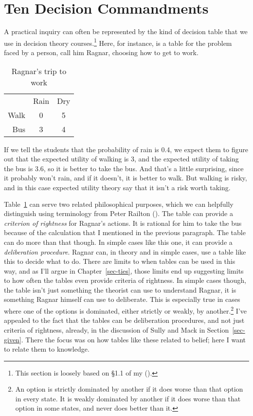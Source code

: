 \documentclass[
  12pt,
  letterpaper,
]{scrbook}
\begin{document}
\section{Ten Decision Commandments}\label{sec-makdec}

A practical inquiry can often be represented by the kind of decision
table that we use in decision theory courses.\footnote{This section is
  loosely based on §1.1 of my ().}
Here, for instance, is a table for the problem faced by a person, call
him Ragnar, choosing how to get to work.

\begin{longtable}[]{@{}rcc@{}}
\caption{Ragnar's trip to work}\label{tbl-walkbus}\tabularnewline
\toprule\noalign{}
\endfirsthead
\endhead
\bottomrule\noalign{}
\endlastfoot
~ & Rain & Dry \\
Walk & 0 & 5 \\
Bus & 3 & 4 \\
\end{longtable}

If we tell the students that the probability of rain is 0.4, we expect
them to figure out that the expected utility of walking is 3, and the
expected utility of taking the bus is 3.6, so it is better to take the
bus. And that's a little surprising, since it probably won't rain, and
if it doesn't, it is better to walk. But walking is risky, and in this
case expected utility theory say that it isn't a risk worth taking.

Table~\ref{tbl-walkbus} can serve two related philosophical purposes,
which we can helpfully distinguish using terminology from Peter Railton
(). The table can provide a
\emph{criterion of rightness} for Ragnar's actions. It is rational for
him to take the bus because of the calculation that I mentioned in the
previous paragraph. The table can do more than that though. In simple
cases like this one, it can provide a \emph{deliberation procedure}.
Ragnar can, in theory and in simple cases, use a table like this to
decide what to do. There are limits to when tables can be used in this
way, and as I'll argue in Chapter~\ref{sec-ties}, those limits end up
suggesting limits to how often the tables even provide criteria of
rightness. In simple cases though, the table isn't just something the
theorist can use to understand Ragnar, it is something Ragnar himself
can use to deliberate. This is especially true in cases where one of the
options is dominated, either strictly or weakly, by another.\footnote{An
  option is strictly dominated by another if it does worse than that
  option in every state. It is weakly dominated by another if it does
  worse than that option in some states, and never does better than it.}
I've appealed to the fact that the tables can be deliberation
procedures, and not just criteria of rightness, already, in the
discussion of Sully and Mack in Section~\ref{sec-given}. There the focus
was on how tables like these related to belief; here I want to relate
them to knowledge.
\end{document}
